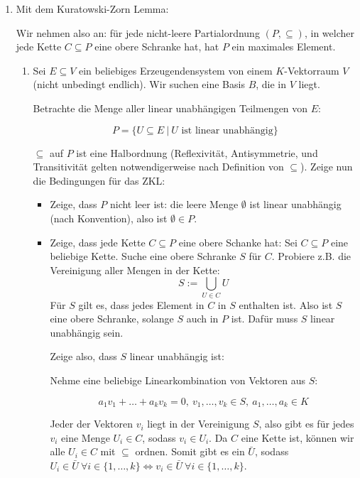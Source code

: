 \documentclass[12pt]{article}
\begin{document}
\begin{enumerate}[label=(\alph*)]
    \item Mit dem Kuratowski-Zorn Lemma: 
    
    Wir nehmen also an: für jede nicht-leere Partialordnung $(P, \subseteq)$, in welcher jede Kette $C \subseteq P$ eine obere Schranke hat, hat $P$ ein maximales Element.
    
    \begin{enumerate}[label=(\Alph*)]
    \item Sei $E \subseteq V$ ein beliebiges Erzeugendensystem von einem $K$-Vektorraum $V$ (nicht unbedingt endlich). Wir suchen eine Basis $B$, die in $V$ liegt.

    Betrachte die Menge aller linear unabhängigen Teilmengen von $E$:

    $$
        P = \{U \subseteq E\ |\ U \text{ ist linear unabhängig}\}
    $$

    $\subseteq$ auf $P$ ist eine Halbordnung (Reflexivität, Antisymmetrie, und Transitivität gelten notwendigerweise nach Definition von $\subseteq$). Zeige nun die Bedingungen für das ZKL:

    \begin{itemize}
        \item Zeige, dass $P$ nicht leer ist: die leere Menge $\emptyset$ ist linear unabhängig (nach Konvention), also ist $\emptyset \in P$.
        \item Zeige, dass jede Kette $C \subseteq P$ eine obere Schanke hat: Sei $C \subseteq P$ eine beliebige Kette. Suche eine obere Schranke $S$ für $C$. Probiere z.B. die Vereinigung aller Mengen in der Kette:
        $$
            S := \bigcup\limits_{U \in C} U
        $$
        Für $S$ gilt es, dass jedes Element in $C$ in $S$ enthalten ist. Also ist $S$ eine obere Schranke, solange $S$ auch in $P$ ist. Dafür muss $S$ linear unabhängig sein.

        Zeige also, dass $S$ linear unabhängig ist:

        Nehme eine beliebige Linearkombination von Vektoren aus $S$:

        $$
            a_1v_1+\dots+a_kv_k = 0,\ v_1,\dots,v_k \in S,\ a_1,\dots,a_k \in K
        $$

        Jeder der Vektoren $v_i$ liegt in der Vereinigung $S$, also gibt es für jedes $v_i$ eine Menge $U_i \in C$, sodass $v_i \in U_i$. Da $C$ eine Kette ist, können wir alle $U_i \in C$ mit $\subseteq$ ordnen. Somit gibt es ein $\bar{U}$, sodass $U_i \in \bar{U} \ \forall i \in \{1, \dots, k\} \iff v_i \in \bar{U} \ \forall i \in \{1, \dots, k\}$.


\end{itemize}
\end{enumerate}
\end{enumerate}
\end{document}

